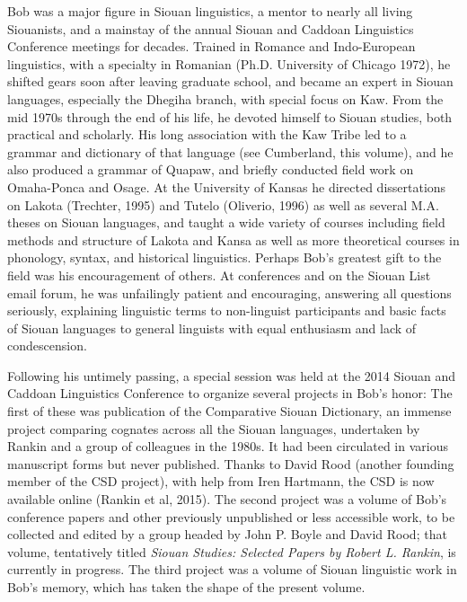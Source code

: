 \begin{refsection}
Bob was a major figure in Siouan linguistics, a mentor to nearly all living Siouanists, and a mainstay of the annual Siouan and Caddoan Linguistics Conference meetings for decades. Trained in Romance and Indo-European linguistics, with a specialty in Romanian (Ph.D. University of Chicago 1972), he shifted gears soon after leaving graduate school, and became an expert in Siouan languages, especially the Dhegiha branch, with special focus on Kaw. From the mid 1970s through the end of his life, he devoted himself to Siouan studies, both practical and scholarly. His long association with the Kaw Tribe led to a grammar and dictionary of that language (see Cumberland, this volume), and he also produced a grammar of Quapaw, and briefly conducted field work on Omaha-Ponca and Osage. At the University of Kansas he directed dissertations on Lakota (Trechter, 1995) and Tutelo (Oliverio, 1996) as well as several M.A. theses on Siouan languages, and taught a wide variety of courses including field methods and structure of Lakota and Kansa as well as more theoretical courses in phonology, syntax, and historical linguistics. Perhaps Bob's greatest gift to the field was his encouragement of others. At conferences and on the Siouan List email forum, he was unfailingly patient and encouraging, answering all questions seriously, explaining linguistic terms to non-linguist participants and basic facts of Siouan languages to general linguists with equal enthusiasm and lack of condescension.

Following his untimely passing, a special session was held at the 2014 Siouan and Caddoan Linguistics Conference to organize several projects in Bob's honor: The first of these was publication of the Comparative Siouan Dictionary, an immense project comparing cognates across all the Siouan languages, undertaken by Rankin and a group of colleagues in the 1980s. It had been circulated in various manuscript forms but never published. Thanks to David Rood (another founding member of the CSD project), with help from Iren Hartmann, the CSD is now available online (Rankin et al, 2015). The second project was a volume of Bob's conference papers and other previously unpublished or less accessible work, to be collected and edited by a group headed by John P. Boyle and David Rood; that volume, tentatively titled \textit{Siouan Studies: Selected Papers by Robert L. Rankin}, is currently in progress. The third project was a volume of Siouan linguistic work in Bob's memory, which has taken the shape of the present volume.


\end{refsection}
